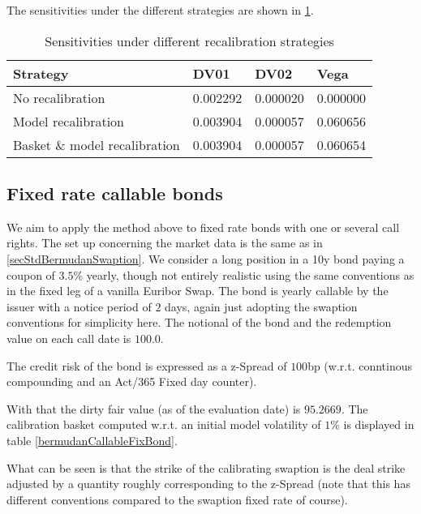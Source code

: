 \documentclass{amsart}
\theoremstyle{plain}
\numberwithin{equation}{section}
\begin{document}
The sensitivities under the different strategies are shown in \ref{sensisStepUpBermudanSwaption}.

\begin{table}[ht]
\caption{Sensitivities under different recalibration strategies}
\begin{tabular}{l | l | l | l}
Strategy & DV01 & DV02 & Vega \\ \hline
No recalibration & 0.002292 & 0.000020 & 0.000000 \\
Model recalibration & 0.003904 & 0.000057 & 0.060656 \\
Basket \& model recalibration & 0.003904 & 0.000057 & 0.060654 \\
\end{tabular}
\label{sensisStepUpBermudanSwaption}
\end{table}

\subsection{Fixed rate callable bonds}

We aim to apply the method above to fixed rate bonds with one or several call rights. The set up concerning the market
data is the same as in \ref{secStdBermudanSwaption}. We consider a long position in a 10y bond paying a coupon of
$3.5\%$ yearly, though not entirely realistic using the same conventions as in the fixed leg of a vanilla Euribor Swap.
The bond is yearly callable by the issuer with a notice period of $2$ days, again just adopting the swaption conventions
for simplicity here. The notional of the bond and the redemption value on each call date is $100.0$.

The credit risk of the bond is expressed as a z-Spread of $100$bp (w.r.t. conntinous compounding and an Act/365 Fixed
day counter).

With that the dirty fair value (as of the evaluation date) is $95.2669$. The calibration basket computed w.r.t. an
initial model volatility of $1\%$ is displayed in table \ref{bermudanCallableFixBond}.

What can be seen is that the strike of the calibrating swaption is the deal strike adjusted by a quantity roughly
corresponding to the z-Spread (note that this has different conventions compared to the swaption fixed rate of course).
\end{document}

